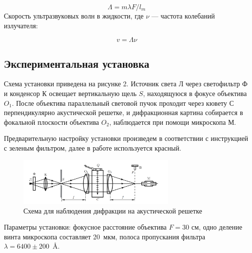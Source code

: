 \documentclass[a4paper, 12pt]{article}%
\begin{document}
    	\begin{equation}\label{}
    	 \Lambda = m \lambda F/ l_m 
    	\end{equation}
    	Скорость ультразвуковых волн в жидкости, где $ \nu $ --- частота колебаний излучателя:
    	
    \begin{equation}\label{}
    	v = \Lambda \nu 
    \end{equation}
    
    \subsection{ Экспериментальная установка}
    Схема установки приведена на рисунке 2. Источник света Л через светофильтр Ф и конденсор К освещает вертикальную щель $ S $, находящуюся в фокусе объектива $ O_1 $. После объектива параллельный световой пучок проходит через кювету С перпендикулярно акустической решетке, и дифракционная картина собирается в фокальной плоскости объектива $O_2$, наблюдается при помощи микроскопа М.

    Предварительную настройку установки произведем в соответствии с инструкцией с зеленым фильтром, далее в работе используется красный.
    
    	\begin{figure}[h!]
    	\centering	
    	\includegraphics[width=0.7\textwidth]{pic/stand.png}
    	\caption{Схема для наблюдения дифракции на акустической решетке}
    	\label{shema1}
    \end{figure}
    
    Параметры установки: фокусное расстояние объектива $F = 30 $ см, одно деление винта микроскопа составляет 20~мкм, полоса пропускания фильтра \mbox{$\lambda = 6400\pm 200$ Å}.
	
\end{document}
